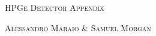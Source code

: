 \documentclass[11pt,a4paper]{article}
\begin{document}
\renewcommand{\thefigure}{A.\arabic{figure}}
\begin{center}

	{\scshape\Huge HPGe Detector Appendix \par} %
	\vspace{0.075cm}
	{\scshape\huge Alessandro Maraio \& Samuel Morgan \par}
\end{center}
\end{document}
